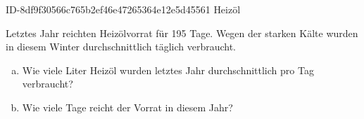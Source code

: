 \begin{exercise}
      {ID-8df9f30566c765b2ef46e47265364e12e5d45561}
      {Heizöl}
  \ifproblem\problem\par
    Letztes Jahr reichten  Heizölvorrat für \num{195} Tage. Wegen der starken
    Kälte wurden in diesem Winter durchschnittlich  täglich verbraucht.
    \begin{enumerate}[a)]
      \item Wie viele Liter Heizöl wurden letztes Jahr durchschnittlich
            pro Tag verbraucht?
      \item Wie viele Tage reicht der Vorrat in diesem Jahr?
    \end{enumerate}
  \fi
\end{exercise}
